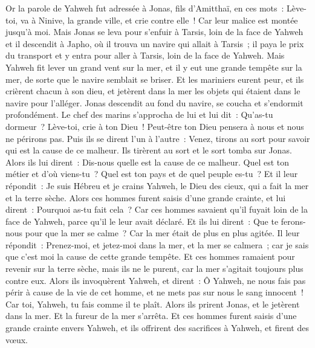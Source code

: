 \begin{multicols}{2}
\VerseOne{}Or la parole de Yahweh fut adressée à Jonas, fils d'Amitthaï, en ces mots~:
Lève-toi, va à Ninive, la grande ville, et crie contre elle~! Car leur malice est montée jusqu'à moi.
Mais Jonas se leva pour s'enfuir à Tarsis, loin de la face de Yahweh et il descendit à Japho, où il trouva un navire qui allait à Tarsis~; il paya le prix du transport et y entra pour aller à Tarsis, loin de la face de Yahweh.
Mais Yahweh fit lever un grand vent sur la mer, et il y eut une grande tempête sur la mer, de sorte que le navire semblait se briser.
Et les mariniers eurent peur, et ils crièrent chacun à son dieu, et jetèrent dans la mer les objets qui étaient dans le navire pour l'alléger. Jonas descendit au fond du navire, se coucha et s'endormit profondément.
Le chef des marins s'approcha de lui et lui dit~: Qu'as-tu dormeur~? Lève-toi, crie à ton Dieu~! Peut-être ton Dieu pensera à nous et nous ne périrons pas.
Puis ils se dirent l'un à l'autre~: Venez, tirons au sort pour savoir qui est la cause de ce malheur. Ils tirèrent au sort et le sort tomba sur Jonas.
Alors ils lui dirent~: Dis-nous quelle est la cause de ce malheur. Quel est ton métier et d'où viens-tu~? Quel est ton pays et de quel peuple es-tu~?
Et il leur répondit~: Je suis Hébreu et je crains Yahweh, le Dieu des cieux, qui a fait la mer et la terre sèche.
Alors ces hommes furent saisis d'une grande crainte, et lui dirent~: Pourquoi as-tu fait cela~? Car ces hommes savaient qu'il fuyait loin de la face de Yahweh, parce qu'il le leur avait déclaré.
Et ils lui dirent~: Que te ferons-nous pour que la mer se calme~? Car la mer était de plus en plus agitée.
Il leur répondit~: Prenez-moi, et jetez-moi dans la mer, et la mer se calmera~; car je sais que c'est moi la cause de cette grande tempête.
Et ces hommes ramaient pour revenir sur la terre sèche, mais ils ne le purent, car la mer s'agitait toujours plus contre eux.
Alors ils invoquèrent Yahweh, et dirent~: Ô Yahweh, ne nous fais pas périr à cause de la vie de cet homme, et ne mets pas sur nous le sang innocent~! Car toi, Yahweh, tu fais comme il te plaît.
Alors ils prirent Jonas, et le jetèrent dans la mer. Et la fureur de la mer s'arrêta.
Et ces hommes furent saisis d'une grande crainte envers Yahweh, et ils offrirent des sacrifices à Yahweh, et firent des vœux.

\end{multicols}
